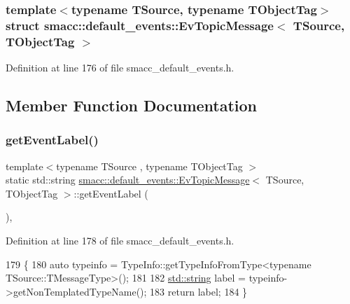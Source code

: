 \subsubsection*{template$<$typename T\+Source, typename T\+Object\+Tag$>$\newline
struct smacc\+::default\+\_\+events\+::\+Ev\+Topic\+Message$<$ T\+Source, T\+Object\+Tag $>$}



Definition at line 176 of file smacc\+\_\+default\+\_\+events.\+h.



\subsection{Member Function Documentation}
\mbox{\label{structsmacc_1_1default__events_1_1EvTopicMessage_afaa5fc76f1c6c3eaf30deb8aa58508c0}} 
\subsubsection{\texorpdfstring{get\+Event\+Label()}{getEventLabel()}}
{\footnotesize\ttfamily template$<$typename T\+Source , typename T\+Object\+Tag $>$ \\
static std\+::string \hyperlink{structsmacc_1_1default__events_1_1EvTopicMessage}{smacc\+::default\+\_\+events\+::\+Ev\+Topic\+Message}$<$ T\+Source, T\+Object\+Tag $>$\+::get\+Event\+Label (\begin{DoxyParamCaption}{ }\end{DoxyParamCaption})\hspace{0.3cm}{\ttfamily [inline]}, {\ttfamily [static]}}



Definition at line 178 of file smacc\+\_\+default\+\_\+events.\+h.


\begin{DoxyCode}
179   \{
180     \textcolor{keyword}{auto} typeinfo = TypeInfo::getTypeInfoFromType<typename TSource::TMessageType>();
181 
182     \hyperlink{namespacetesting_1_1internal_a8e8ff5b11e64078831112677156cb111}{std::string} label = typeinfo->getNonTemplatedTypeName();
183     \textcolor{keywordflow}{return} label;
184   \}
\end{DoxyCode}


